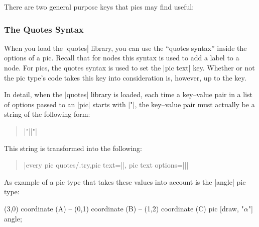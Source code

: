 There are two general purpose keys that pics may find useful:




\subsubsection{The Quotes Syntax}
\label{section-pic-quotes}

When you load the |quotes| library, you can use the ``quotes syntax'' inside
the options of a pic. Recall that for nodes this syntax is used to add a label
to a node. For pics, the quotes syntax is used to set the |pic text| key.
Whether or not the pic type's code takes this key into consideration is,
however, up to the key.

In detail, when the |quotes| library is loaded, each time a key--value pair in
a list of options passed to an |pic| starts with |"|, the key--value pair must
actually be a string of the following form:
%
\begin{quote}
    |"||"|
\end{quote}
%
This string is transformed into the following:
%
\begin{quote}
    |every pic quotes/.try,pic text=||, pic text options={||}|
\end{quote}

As example of a pic type that takes these values into account is the |angle|
pic type:
%
\begin{codeexample}[]
\tikz \draw (3,0) coordinate (A)
         -- (0,1) coordinate (B)
         -- (1,2) coordinate (C)
            pic [draw, "$\alpha$"] {angle};
\end{codeexample}

